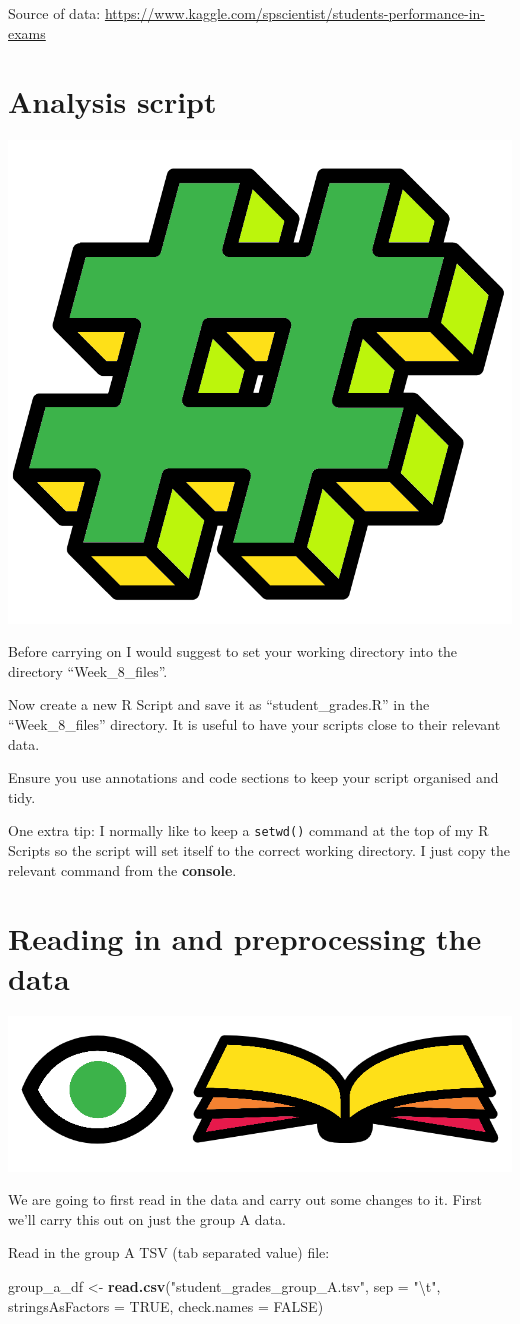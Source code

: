 \documentclass[]{book}
\newenvironment{Shaded}{\begin{snugshade}}{\end{snugshade}}
\newcommand{\KeywordTok}[1]{\textcolor[rgb]{0.13,0.29,0.53}{\textbf{#1}}}
\newcommand{\DataTypeTok}[1]{\textcolor[rgb]{0.13,0.29,0.53}{#1}}
\newcommand{\CharTok}[1]{\textcolor[rgb]{0.31,0.60,0.02}{#1}}
\newcommand{\StringTok}[1]{\textcolor[rgb]{0.31,0.60,0.02}{#1}}
\newcommand{\OtherTok}[1]{\textcolor[rgb]{0.56,0.35,0.01}{#1}}
\newcommand{\NormalTok}[1]{#1}
\begin{document}
Source of data:
\url{https://www.kaggle.com/spscientist/students-performance-in-exams}

\section{Analysis script}\label{analysis-script}

\begin{center}\includegraphics[width=0.2\linewidth]{figures/hashtag2} \end{center}

Before carrying on I would suggest to set your working directory into
the directory ``Week\_8\_files''.

Now create a new R Script and save it as ``student\_grades.R'' in the
``Week\_8\_files'' directory. It is useful to have your scripts close to
their relevant data.

Ensure you use annotations and code sections to keep your script
organised and tidy.

One extra tip: I normally like to keep a \texttt{setwd()} command at the
top of my R Scripts so the script will set itself to the correct working
directory. I just copy the relevant command from the \textbf{console}.

\section{Reading in and preprocessing the
data}\label{reading-in-and-preprocessing-the-data}

\begin{center}\includegraphics[width=0.2\linewidth]{figures/r_read} \end{center}

We are going to first read in the data and carry out some changes to it.
First we'll carry this out on just the group A data.

Read in the group A TSV (tab separated value) file:

\begin{Shaded}
\begin{Highlighting}[]
\NormalTok{group_a_df <-}\StringTok{ }\KeywordTok{read.csv}\NormalTok{(}\StringTok{"student_grades_group_A.tsv"}\NormalTok{,}
                       \DataTypeTok{sep =} \StringTok{"}\CharTok{\textbackslash{}t}\StringTok{"}\NormalTok{,}
                       \DataTypeTok{stringsAsFactors =} \OtherTok{TRUE}\NormalTok{,}
                       \DataTypeTok{check.names =} \OtherTok{FALSE}\NormalTok{)}
\end{Highlighting}
\end{Shaded}
\end{document}
